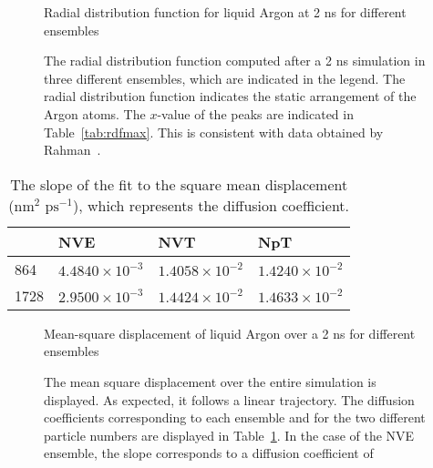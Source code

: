 \documentclass[12pt]{article}
\begin{document}
\begin{figure}
	\centering
	Radial distribution function for liquid Argon at 2 ns for different ensembles\\
	\begin{subfigure}[b]{0.5\textwidth}
		
		\caption{}
		\label{fig:rdf864}
	\end{subfigure}%
	\begin{subfigure}[b]{0.5\textwidth}
		
		\caption{}
		\label{fig:rdf1728}
	\end{subfigure}
	\caption{The radial distribution function computed after a 2 ns simulation in three different ensembles, which are indicated in the legend. The radial distribution function indicates the static arrangement of the Argon atoms. The $x$-value of the peaks are indicated in Table~\ref{tab:rdfmax}. This is consistent with data obtained by Rahman~\cite{Rahman1964}.}
	\label{fig:rdf}
\end{figure}



\clearpage


\begin{table}
	\caption{The slope of the fit to the square mean displacement ($\text{nm}^2 \text{ ps}^{-1}$), which represents the diffusion coefficient.}
	\centering
	\begin{tabular}{|l|l|l|l|}
		\hline
		& NVE & NVT & NpT  \\ \hline
		864 & $4.4840\times 10^{-3}$ & $1.4058\times 10^{-2}$ & $1.4240\times 10^{-2}$  \\ \hline
		1728 & $2.9500\times 10^{-3}$ & $1.4424\times 10^{-2}$ & $1.4633\times 10^{-2}$  \\ \hline
	\end{tabular}
	\label{tab:msd}
\end{table}

\begin{figure}
	\centering
	Mean-square displacement of liquid Argon over a 2 ns for different ensembles\\
	\begin{subfigure}[b]{0.5\textwidth}
		
		\caption{}
		\label{fig:msd864}
	\end{subfigure}%
	\begin{subfigure}[b]{0.5\textwidth}
		
		\caption{}
		\label{fig:msd1728}
	\end{subfigure}
	\caption{The mean square displacement over the entire simulation is displayed. As expected, it follows a linear trajectory. The diffusion coefficients corresponding to each ensemble and for the two different particle numbers are displayed in Table~\ref{tab:msd}. In the case of the NVE ensemble, the slope corresponds to a diffusion coefficient of }
	\label{fig:msd}
\end{figure}
\end{document}
